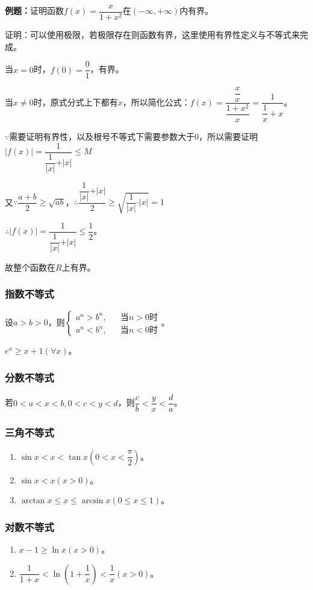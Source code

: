 \documentclass[UTF8, 12pt]{ctexart}
\begin{document}
\textbf{例题：}证明函数$f(x)=\dfrac{x}{1+x^2}$在$(-\infty,+\infty)$内有界。

证明：可以使用极限，若极限存在则函数有界，这里使用有界性定义与不等式来完成。

当$x=0$时，$f(0)=\dfrac{0}{1}$，有界。

当$x\neq 0$时，原式分式上下都有$x$，所以简化公式：$f(x)=\dfrac{\dfrac{x}{x}}{\dfrac{1+x^2}{x}}=\dfrac{1}{\dfrac{1}{x}+x}$。

$\because$需要证明有界性，以及根号不等式下需要参数大于0，所以需要证明$\vert f(x)\vert=\dfrac{1}{\dfrac{1}{\vert x\vert}+\vert x\vert}\leqslant M$

又$\because\dfrac{a+b}{2}\geqslant\sqrt{ab}$，$\therefore \dfrac{\dfrac{1}{\vert x\vert}+\vert x\vert}{2}\geqslant\sqrt{\dfrac{1}{\vert x\vert}\cdot\vert x\vert}=1$

$\therefore\vert f(x)\vert=\dfrac{1}{\dfrac{1}{\vert x\vert}+\vert x\vert}\leqslant\dfrac{1}{2}$。

故整个函数在$R$上有界。

\subsubsection{指数不等式}

设$a>b>0$，则$
\left\{
\begin{array}{lcl}
    a^n>b^n,   &  & \text{当}n>0\text{时} \\
    a^n<b^n, &  & \text{当}n<0\text{时}
\end{array}
\right.$。

$e^x\geqslant x+1(\forall x)$。

\subsubsection{分数不等式}

若$0<a<x<b,0<c<y<d$，则$\dfrac{c}{b}<\dfrac{y}{x}<\dfrac{d}{a}$。

\subsubsection{三角不等式}

\begin{enumerate}
    \item $\sin x<x<\tan x(0<x<\dfrac{\pi}{2})$。
    \item $\sin x<x(x>0)$。
    \item $\arctan x\leqslant x\leqslant\arcsin x(0\leqslant x\leqslant 1)$。
\end{enumerate}

\subsubsection{对数不等式}

\begin{enumerate}
    \item $x-1\geqslant\ln x(x>0)$。
    \item $\dfrac{1}{1+x}<\ln(1+\dfrac{1}{x})<\dfrac{1}{x}(x>0)$。
\end{enumerate}
\end{document}
